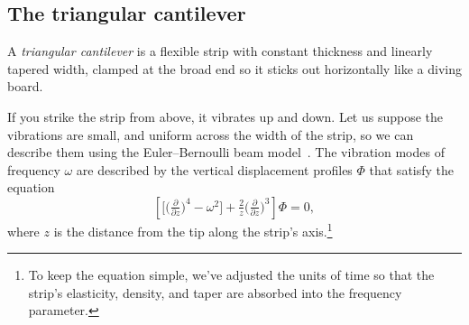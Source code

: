 \documentclass{article}
\theoremstyle{definition}
\theoremstyle{plain}
\begin{document}
\subsection{The triangular cantilever}\label{sec:catilever}
A {\em triangular cantilever} is a flexible strip with constant thickness and linearly tapered width, clamped at the broad end so it sticks out horizontally like a diving board.
\begin{center}
\end{center}
If you strike the strip from above, it vibrates up and down. Let us suppose the vibrations are small, and uniform across the width of the strip, so we can describe them using the Euler--Bernoulli beam model~\cite[\S 12.4]{genta2009vibration}. The vibration modes of frequency $\omega$ are described by the vertical displacement profiles $\Phi$ that satisfy the equation
\begin{equation}\label{eqn:triangular_cantilever}
    \left[\big[\big(\tfrac{\partial}{\partial z}\big)^4 - \omega^2\big] + \tfrac{2}{z}\big(\tfrac{\partial}{\partial z}\big)^3\right] \Phi = 0,
\end{equation}
where $z$ is the distance from the tip along the strip's axis.\footnote{To keep the equation simple, we've adjusted the units of time so that the strip's elasticity, density, and taper are absorbed into the frequency parameter.}
\end{document}
